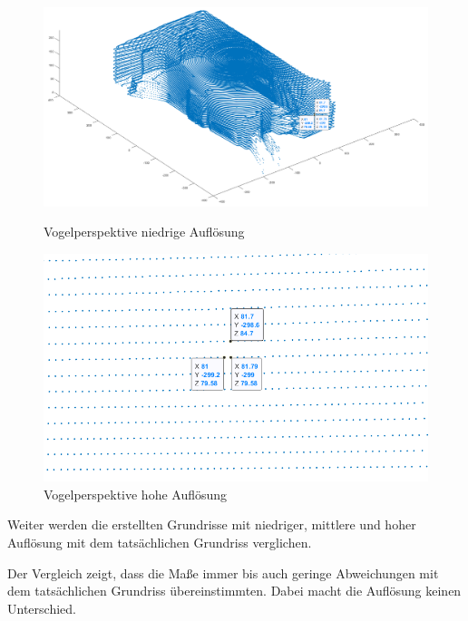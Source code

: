 \begin{figure}[htb]
	\centering
	\begin{minipage}[t]{0.45\linewidth}
		\centering
		\includegraphics[width=1.2\linewidth]{images/Validierung/Aufloesungen/3Messwerte_Wand.png}
		\caption{Vogelperspektive niedrige Auflösung}
		\label{vogel niedriasdasgeAuflösung}
	\end{minipage}
	\hfill
	\begin{minipage}[t]{0.45\linewidth}
		\centering
		\includegraphics[width=1.2\linewidth]{images/Validierung/Aufloesungen/Wand_3Messungen.png}
		\caption{Vogelperspektive hohe Auflösung}
		\label{vogel hohasdeAuflösung}
	\end{minipage}
\end{figure}


Weiter werden die erstellten Grundrisse mit niedriger, mittlere und hoher Auflösung mit dem tatsächlichen Grundriss verglichen.

Der Vergleich zeigt, dass die Maße immer bis auch geringe Abweichungen mit dem tatsächlichen Grundriss übereinstimmten. Dabei macht die Auflösung keinen Unterschied. 

